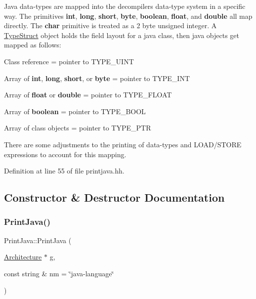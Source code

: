 Java data-\/types are mapped into the decompiler\textquotesingle{}s data-\/type system in a specific way. The primitives {\bfseries{int}}, {\bfseries{long}}, {\bfseries{short}}, {\bfseries{byte}}, {\bfseries{boolean}}, {\bfseries{float}}, and {\bfseries{double}} all map directly. The {\bfseries{char}} primitive is treated as a 2 byte unsigned integer. A \mbox{\hyperlink{class_type_struct}{Type\+Struct}} object holds the field layout for a java class, then java objects get mapped as follows\+:
\begin{DoxyItemize}
\item Class reference = pointer to T\+Y\+P\+E\+\_\+\+U\+I\+NT
\item Array of {\bfseries{int}}, {\bfseries{long}}, {\bfseries{short}}, or {\bfseries{byte}} = pointer to T\+Y\+P\+E\+\_\+\+I\+NT
\item Array of {\bfseries{float}} or {\bfseries{double}} = pointer to T\+Y\+P\+E\+\_\+\+F\+L\+O\+AT
\item Array of {\bfseries{boolean}} = pointer to T\+Y\+P\+E\+\_\+\+B\+O\+OL
\item Array of class objects = pointer to T\+Y\+P\+E\+\_\+\+P\+TR
\end{DoxyItemize}

There are some adjustments to the printing of data-\/types and L\+O\+A\+D/\+S\+T\+O\+RE expressions to account for this mapping. 

Definition at line 55 of file printjava.\+hh.



\subsection{Constructor \& Destructor Documentation}
\mbox{\label{class_print_java_adb73af82f5926d43f6f8ac928b807229}} 
\subsubsection{\texorpdfstring{PrintJava()}{PrintJava()}}
{\footnotesize\ttfamily Print\+Java\+::\+Print\+Java (\begin{DoxyParamCaption}\item[{\mbox{\hyperlink{class_architecture}{Architecture}} $\ast$}]{g,  }\item[{const string \&}]{nm = {\ttfamily \char`\"{}java-\/language\char`\"{}} }\end{DoxyParamCaption})}




